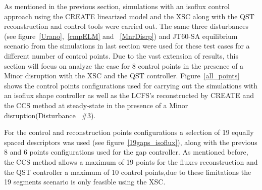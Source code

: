 As mentioned in the previous section, simulations with an isoflux control approach using the CREATE linearized model and the XSC along with the QST reconstruction and control tools were carried out. The same three disturbances (see figure~\ref{Urano},~\ref{cmpELM} and ~\ref{MnrDisrp}) and JT60-SA equilibrium scenario from the simulations in last section were used for these test cases for a different number of control points.  Due to the vast extension of results, this section will focus on analyze the case for 8 control points in the presence of a Minor disruption with the XSC and the QST controller. Figure~\ref{all_points} shows the control points configurations used for carrying out the simulations with an isoflux shape controller as well as the LCFS's reconstructed by CREATE and  the CCS method at steady-state in the presence of a Minor disruption(Disturbance~ $\#3$). 
\smallskip

For the control and reconstruction points configurations a selection of 19 equally spaced descriptors was used (see figure~\ref{19gaps_isoflux}),  along with the previous 8 and 6 points configurations used for the gap controller. As mentioned before, the CCS method allows a maximum of 19 points for the fluxes reconstruction and the QST controller a maximum of 10 control points,due to these  limitations the 19 segments scenario is only  feasible using the XSC.
\smallskip


